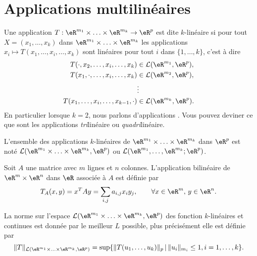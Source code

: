 \section{Applications multilinéaires}

\begin{definition}
 	Une application $T: \eR^{m_1}\times \ldots \times\eR^{m_k}\to\eR^p $ est dite $k$-linéaire si pour tout $X=(x_1, \ldots,x_k)$ dans $ \eR^{m_1}\times \ldots \times\eR^{m_k}$ les applications $x_i\mapsto T(x_1, \ldots, x_i,\ldots,x_k)$ sont linéaires pour tout $i$ dans $\{1,\ldots,k\}$, c'est à dire
	\begin{equation}
		\begin{aligned}[]
			T(\cdot,x_2, \ldots, x_i,\ldots,x_k)&\in \mathcal{L}(\eR^{m_1}, \eR^p),\\
			T(x_1,\cdot, \ldots, x_i,\ldots,x_k)&\in \mathcal{L}(\eR^{m_2}, \eR^p),\\
						& \vdots\\
			T(x_1, \ldots, x_i,\ldots,x_{k-1},\cdot)&\in \mathcal{L}(\eR^{m_k}, \eR^p).\\
		\end{aligned}
	\end{equation}
	En particulier lorsque $k=2$, nous parlons d'applications . Vous pouvez deviner ce que sont les applications \emph{tri}linéaire ou \emph{quadri}linéaire.
\end{definition}

L'ensemble des applications $k$-linéaires de $ \eR^{m_1}\times \ldots \times\eR^{m_k}$ dans $\eR^p$ est noté $\mathcal{L}(\eR^{m_1}\times \ldots \times\eR^{m_k}, \eR^p)$ ou $\mathcal{L}(\eR^{m_1}, \ldots,\eR^{m_k}; \eR^p)$.

\begin{example}
  Soit $A$ une matrice avec $m$ lignes et $n$ colonnes. L'application bilinéaire de $\eR^m\times \eR^n$ dans $\eR$ associée à $A$ est définie par
\[
T_A(x,y)= x^TAy=\sum_{i,j}a_{i,j}x_i y_j, \qquad \forall x\in \eR^m, \, y \in \eR^n.
\]
\end{example}

\begin{definition}
	La norme sur l'espace $\mathcal{L}(\eR^{m_1}\times \ldots \times\eR^{m_k}, \eR^p)$ des fonction $k$-linéaires et continues est donnée par le meilleur $L$ possible, plus précisément elle est  définie par 
	\begin{equation}
		\|T\|_{\mathcal{L}(\eR^{m_1}\times \ldots \times\eR^{m_k}, \eR^p)}=\sup\{ \|T(u_1, \ldots,u_k)\|_p\,\vert\,\|u_i\|_{m_i}\leq 1, i=1,\ldots, k \}.
	\end{equation}
\end{definition}

